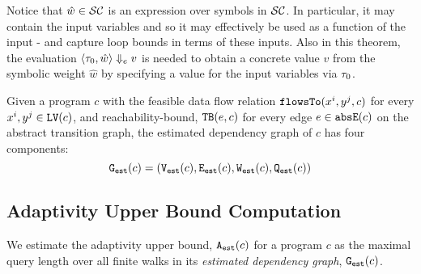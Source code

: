 Notice that $\hat{w} \in \mathcal{SC}$ is an expression over symbols in $\mathcal{SC}$. In particular, it may contain the input variables and so it may effectively be used as a function of the input - and capture loop bounds in terms of these inputs.
Also in this theorem, the evaluation $\langle \mathtt{\tau}_0, \hat{w} \rangle \Downarrow_e v$ is needed to obtain a concrete value $v$ from the symbolic weight $\hat{w}$ by specifying a value for the input variables via $\mathtt{\tau}_0$.


%

\begin{defn}
  \label{def:prog_graph}
  Given a program $c$ 
  with the feasible data flow relation $\mathtt{flowsTo}(x^i, y^j, c)$ for every $x^i, y^j \in \mathtt{LV}(c)$, 
  and reachability-bound, ${\mathtt{TB}}(e, c)$ for every edge $e \in \mathtt{abs}{\mathtt{E}}(c)$ on the abstract transition graph,
  the estimated dependency graph of $c$ has four components:
  \[\mathtt{{G_{est}}}(c) = (\mathtt{{V_{est}}}(c), \mathtt{{E_{est}}}(c), \mathtt{{W_{est}}}(c), \mathtt{{Q_{est}}}(c))\]
\end{defn}

\subsection{Adaptivity Upper Bound Computation}
\label{sec:alg_adaptcompute}
We estimate the adaptivity upper bound, 
${\mathtt{A_{est}}}(c)$ for a program $c$ as the maximal query length over all finite walks 
in its \emph{estimated dependency graph}, $\mathtt{{G_{est}}}({c})$.
%

